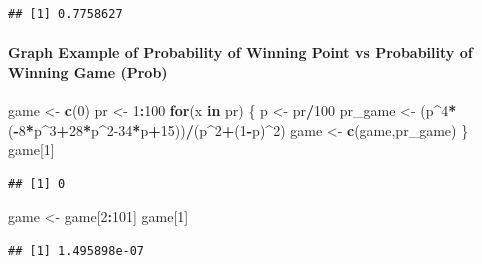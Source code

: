 \documentclass[]{article}
\newenvironment{Shaded}{\begin{snugshade}}{\end{snugshade}}
\newcommand{\ControlFlowTok}[1]{\textcolor[rgb]{0.13,0.29,0.53}{\textbf{#1}}}
\newcommand{\DecValTok}[1]{\textcolor[rgb]{0.00,0.00,0.81}{#1}}
\newcommand{\KeywordTok}[1]{\textcolor[rgb]{0.13,0.29,0.53}{\textbf{#1}}}
\newcommand{\NormalTok}[1]{#1}
\newcommand{\OperatorTok}[1]{\textcolor[rgb]{0.81,0.36,0.00}{\textbf{#1}}}
\newcommand{\StringTok}[1]{\textcolor[rgb]{0.31,0.60,0.02}{#1}}
\let\oldparagraph\paragraph
\renewcommand{\paragraph}[1]{\oldparagraph{#1}\mbox{}}
\begin{document}
\begin{verbatim}
## [1] 0.7758627
\end{verbatim}

\hypertarget{graph-example-of-probability-of-winning-point-vs-probability-of-winning-game-prob}{%
\paragraph{Graph Example of Probability of Winning Point vs Probability
of Winning Game
(Prob)}\label{graph-example-of-probability-of-winning-point-vs-probability-of-winning-game-prob}}

\begin{Shaded}
\begin{Highlighting}[]
\NormalTok{game <-}\StringTok{ }\KeywordTok{c}\NormalTok{(}\DecValTok{0}\NormalTok{)}
\NormalTok{pr <-}\StringTok{ }\DecValTok{1}\OperatorTok{:}\DecValTok{100}
\ControlFlowTok{for}\NormalTok{(x }\ControlFlowTok{in}\NormalTok{ pr) \{}
\NormalTok{  p <-}\StringTok{ }\NormalTok{pr}\OperatorTok{/}\DecValTok{100}
\NormalTok{  pr_game <-}\StringTok{ }\NormalTok{(p}\OperatorTok{^}\DecValTok{4}\OperatorTok{*}\NormalTok{(}\OperatorTok{-}\DecValTok{8}\OperatorTok{*}\NormalTok{p}\OperatorTok{^}\DecValTok{3}\OperatorTok{+}\DecValTok{28}\OperatorTok{*}\NormalTok{p}\OperatorTok{^}\DecValTok{2-34}\OperatorTok{*}\NormalTok{p}\OperatorTok{+}\DecValTok{15}\NormalTok{))}\OperatorTok{/}\NormalTok{(p}\OperatorTok{^}\DecValTok{2}\OperatorTok{+}\NormalTok{(}\DecValTok{1}\OperatorTok{-}\NormalTok{p)}\OperatorTok{^}\DecValTok{2}\NormalTok{)}
\NormalTok{  game <-}\StringTok{ }\KeywordTok{c}\NormalTok{(game,pr_game)}
\NormalTok{\}}
\NormalTok{game[}\DecValTok{1}\NormalTok{]}
\end{Highlighting}
\end{Shaded}

\begin{verbatim}
## [1] 0
\end{verbatim}

\begin{Shaded}
\begin{Highlighting}[]
\NormalTok{game <-}\StringTok{ }\NormalTok{game[}\DecValTok{2}\OperatorTok{:}\DecValTok{101}\NormalTok{]}
\NormalTok{game[}\DecValTok{1}\NormalTok{]}
\end{Highlighting}
\end{Shaded}

\begin{verbatim}
## [1] 1.495898e-07
\end{verbatim}
\end{document}
